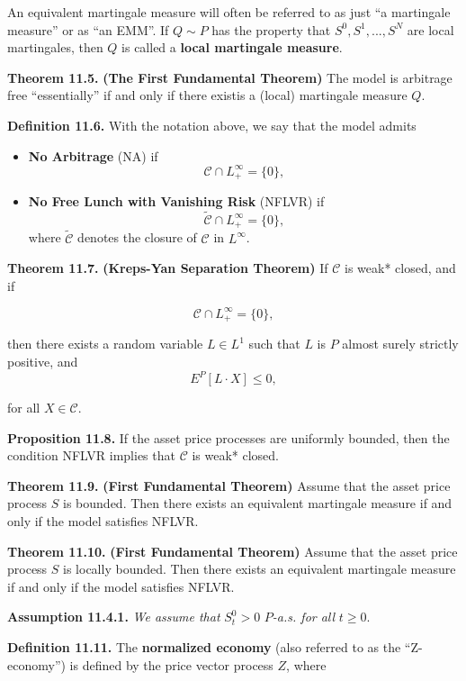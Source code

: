 \documentclass[
]{article}
\providecommand{\tightlist}{%
  \setlength{\itemsep}{0pt}\setlength{\parskip}{0pt}}
\begin{document}
An equivalent martingale measure will often be referred to as just ``a
martingale measure'' or as ``an EMM''. If \(Q\sim P\) has the property
that \(S^0,S^1,...,S^N\) are local martingales, then \(Q\) is called a
\textbf{local martingale measure}.

\textbf{Theorem 11.5.} \textbf{(The First Fundamental Theorem)} The
model is arbitrage free ``essentially'' if and only if there existis a
(local) martingale measure \(Q\).

\textbf{Definition 11.6.} With the notation above, we say that the model
admits

\begin{itemize}
\tightlist
\item
  \textbf{No Arbitrage} (NA) if \[
    \mathcal{C}\cap L_+^\infty=\{0\},
    \]
\item
  \textbf{No Free Lunch with Vanishing Risk} (NFLVR) if \[
    \tilde{\mathcal{C}}\cap L_+^\infty=\{0\},
    \] where \(\tilde{\mathcal{C}}\) denotes the closure of
  \(\mathcal{C}\) in \(L^\infty\).
\end{itemize}

\textbf{Theorem 11.7.} \textbf{(Kreps-Yan Separation Theorem)} If
\(\mathcal{C}\) is weak* closed, and if

\[
\mathcal{C}\cap L_+^\infty=\{0\},
\]

then there exists a random variable \(L\in L^1\) such that \(L\) is
\(P\) almost surely strictly positive, and \[
E^P[L\cdot X]\le 0,
\]

for all \(X\in\mathcal{C}\).

\textbf{Proposition 11.8.} If the asset price processes are uniformly
bounded, then the condition NFLVR implies that \(\mathcal{C}\) is weak*
closed.

\textbf{Theorem 11.9.} \textbf{(First Fundamental Theorem)} Assume that
the asset price process \(S\) is bounded. Then there exists an
equivalent martingale measure if and only if the model satisfies NFLVR.

\textbf{Theorem 11.10.} \textbf{(First Fundamental Theorem)} Assume that
the asset price process \(S\) is locally bounded. Then there exists an
equivalent martingale measure if and only if the model satisfies NFLVR.

\textbf{Assumption 11.4.1.} \emph{We assume that }\(S_t^0>0\)
\(P\)\emph{-a.s. for all }\(t\ge 0\).

\textbf{Definition 11.11.} The \textbf{normalized economy} (also
referred to as the ``Z-economy'') is defined by the price vector process
\(Z\), where
\end{document}

